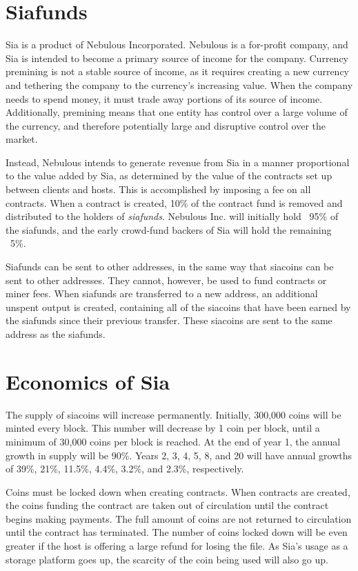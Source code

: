 \documentclass[twocolumn]{article}
\begin{document}
\section{Siafunds}
Sia is a product of Nebulous Incorporated.
Nebulous is a for-profit company, and Sia is intended to become a primary source of income for the company.
Currency premining is not a stable source of income, as it requires creating a new currency and tethering the company to the currency's increasing value. %
When the company needs to spend money, it must trade away portions of its source of income.
Additionally, premining means that one entity has control over a large volume of the currency, and therefore potentially large and disruptive control over the market.

Instead, Nebulous intends to generate revenue from Sia in a manner proportional to the value added by Sia, as determined by the value of the contracts set up between clients and hosts.
This is accomplished by imposing a fee on all contracts.
When a contract is created, 10\% of the contract fund is removed and distributed to the holders of \textit{siafunds}.
Nebulous Inc. will initially hold ~95\% of the siafunds, and the early crowd-fund backers of Sia will hold the remaining ~5\%.

Siafunds can be sent to other addresses, in the same way that siacoins can be sent to other addresses.
They cannot, however, be used to fund contracts or miner fees.
When siafunds are transferred to a new address, an additional unspent output is created, containing all of the siacoins that have been earned by the siafunds since their previous transfer.
These siacoins are sent to the same address as the siafunds.

\section{Economics of Sia}
The supply of siacoins will increase permanently.
Initially, 300,000 coins will be minted every block.
This number will decrease by 1 coin per block, until a minimum of 30,000 coins per block is reached.
At the end of year 1, the annual growth in supply will be 90\%.
Years 2, 3, 4, 5, 8, and 20 will have annual growths of 39\%, 21\%, 11.5\%, 4.4\%, 3.2\%, and 2.3\%, respectively.

Coins must be locked down when creating contracts.
When contracts are created, the coins funding the contract are taken out of circulation until the contract begins making payments.
The full amount of coins are not returned to circulation until the contract has terminated.
The number of coins locked down will be even greater if the host is offering a large refund for losing the file.
As Sia's usage as a storage platform goes up, the scarcity of the coin being used will also go up.
\end{document}
